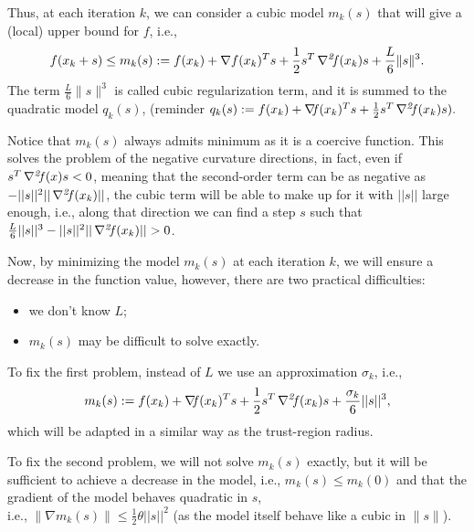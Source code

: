 \documentclass[10pt,a4paper]{article}
\begin{document}
Thus, at each iteration $k$, we can consider a cubic model $m_k(s)$ that will give a (local) upper bound for $f$, i.e., 
$$ f(x_k+s) \leq m_k(s):= f(x_k) +\nabla f(x_k)^T s + \frac{1}{2}s^T \operatorname*{\mathit{\nabla^2 \!f}}(x_k)s + \frac{L}{6}\|s\|^3.$$
The term $\frac{L}{6}\|s\|^3$ is called cubic regularization term, and it is summed to the quadratic model $q_k(s)$, (reminder $q_k(s) := f(x_k)+ \operatorname*{\mathit{\nabla \!f}}(x_k)^Ts + \frac{1}{2}s^T\operatorname*{\mathit{\nabla^2 \!f}}(x_k) s).$
\begin{remark}
	Notice that $m_k(s)$ always admits minimum as it is a coercive function. This solves the problem of the negative curvature directions, in fact, even if $s^T \operatorname*{\mathit{\nabla^2 \!f}}(x)s<0$, meaning that the second-order term can be as negative as $-||s||^2 ||\operatorname*{\mathit{\nabla^2 \!f}}(x_k)||$, the cubic term will be able to make up for it with $||s||$ large enough, i.e., along that direction we can find a step $s$ such that $\frac{L}{6} ||s||^3 -||s||^2 ||\hess(x_k)||>0$.
\end{remark}
Now, by minimizing the model $m_k(s)$ at each iteration $k$, we will ensure a decrease in the function value, however, there are two practical difficulties:
\begin{itemize}
	\item we don't know $L$;
	\item $m_k(s)$ may be difficult to solve exactly.
\end{itemize}
To fix the first problem, instead of $L$ we use an approximation $\sigma_k$, i.e., 
\begin{equation}\label{eq:cubic_reg_model}
	m_k(s) := f(x_k)+ \operatorname*{\mathit{\nabla \!f}}(x_k)^Ts + \frac{1}{2}s^T\operatorname*{\mathit{\nabla^2 \!f}}(x_k)s + \frac{\sigma_k}{6} ||s||^3,
\end{equation}
which will be adapted in a similar way as the trust-region radius. 
\par To fix the second problem, we will not solve $m_k(s)$ exactly, but it will be sufficient to achieve a decrease in the model, i.e., $m_k(s)\leq m_k(0)$ and that the gradient of the model behaves quadratic in $s$, \\i.e., $\|\nabla m_k(s)\|\leq \frac{1}{2}\theta ||s||^2$ (as the model itself behave like a cubic in $\|s\|$).
\end{document}
